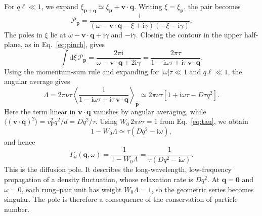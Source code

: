 For $q\ell\ll1$, we expand
$\xi_{\mathbf p+\mathbf q}\simeq
\xi_{\mathbf p}+\mathbf v\cdot\mathbf q$. Writing
$\xi=\xi_{\mathbf p}$, the pair becomes
\[
\mathcal P_{\mathbf p}
=\frac{1}{
(\omega-\mathbf v\cdot\mathbf q-\xi+\mathrm{i}\gamma)
(-\xi-\mathrm{i}\gamma)}.
\]
The poles in $\xi$ lie at
$\omega-\mathbf v\cdot\mathbf q+\mathrm{i}\gamma$
and $-\mathrm{i}\gamma$. Closing the contour in the upper half-plane,
as in Eq.~\eqref{eq:pinch}, gives
\[
\int\mathrm{d}\xi\,\mathcal P_{\mathbf p}
=\frac{2\pi\mathrm{i}}
{\omega-\mathbf v\cdot\mathbf q+2\mathrm{i}\gamma}
=\frac{2\pi\tau}
{1-\mathrm{i}\omega\tau+
 \mathrm{i}\tau\,\mathbf v\cdot\mathbf q}.
\]
Using the momentum-sum rule and expanding for
$|\omega|\tau\ll1$ and $q\ell\ll1$, the angular average gives
\[
\Lambda
=2\pi\nu\tau
\left\langle
\frac{1}{1-\mathrm{i}\omega\tau+
\mathrm{i}\tau\,\mathbf v\cdot\mathbf q}
\right\rangle_{\hat{\mathbf p}}
\simeq
2\pi\nu\tau
\left[1+\mathrm{i}\omega\tau-D\tau q^2\right].
\]
Here the term linear in $\mathbf v\cdot\mathbf q$ vanishes by angular
averaging, while
$\langle(\mathbf v\cdot\mathbf q)^2\rangle
=v_{\mathrm F}^2q^2/d=Dq^2/\tau$.
Using $W_0\,2\pi\nu\tau=1$ from Eq.~\eqref{eq:tau}, we obtain
\[
1-W_0\Lambda
\simeq\tau(Dq^2-\mathrm{i}\omega),
\]
and hence
\begin{equation}
\Gamma_d(\mathbf q,\omega)
=\frac{1}{1-W_0\Lambda}
=\frac{1}{\tau(Dq^2-\mathrm{i}\omega)}.
\label{eq:diffpole}
\end{equation}
This is the diffusion pole. It describes the long-wavelength,
low-frequency propagation of a density fluctuation, whose relaxation
rate is $Dq^2$. At $\mathbf q=\mathbf 0$ and $\omega=0$, each
rung--pair unit has weight $W_0\Lambda=1$, so the geometric series
becomes singular. The pole is therefore a consequence of the
conservation of particle number.

